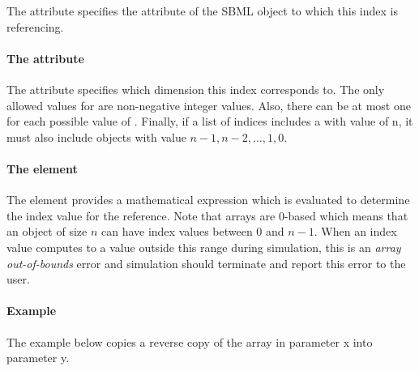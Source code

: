 The  attribute specifies the attribute of the SBML object to which this index is referencing.    

\paragraph{The  attribute}

The  attribute specifies which dimension this index corresponds to.
The only allowed values for  are
  non-negative integer values. Also, there can be at most one \Index for each possible value of
. Finally, if a list of indices includes a
\Index with  value of n, it must also
include \Index objects with value $n-1, n-2, \dots , 1, 0$.

\paragraph{The  element}

The  element provides a mathematical expression which is evaluated to determine the index value for the reference.   Note that arrays are 0-based which means that an object of size $n$ can have index values between 0 and $n-1$.   When an index value computes to a value outside this range during simulation, this is an \emph{array out-of-bounds} error and simulation should terminate and report this error to the user.

\paragraph{Example}

The example below copies a reverse copy of the array in parameter x into parameter y.    

